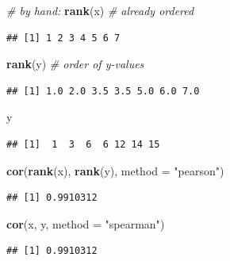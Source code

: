 \documentclass[
]{book}
\newenvironment{Shaded}{\begin{snugshade}}{\end{snugshade}}
\newcommand{\AttributeTok}[1]{\textcolor[rgb]{0.13,0.29,0.53}{#1}}
\newcommand{\CommentTok}[1]{\textcolor[rgb]{0.56,0.35,0.01}{\textit{#1}}}
\newcommand{\FunctionTok}[1]{\textcolor[rgb]{0.13,0.29,0.53}{\textbf{#1}}}
\newcommand{\NormalTok}[1]{#1}
\newcommand{\StringTok}[1]{\textcolor[rgb]{0.31,0.60,0.02}{#1}}
\begin{document}
\begin{Shaded}
\begin{Highlighting}[]
\CommentTok{\# by hand:}
\FunctionTok{rank}\NormalTok{(x) }\CommentTok{\# already ordered}
\end{Highlighting}
\end{Shaded}

\begin{verbatim}
## [1] 1 2 3 4 5 6 7
\end{verbatim}

\begin{Shaded}
\begin{Highlighting}[]
\FunctionTok{rank}\NormalTok{(y) }\CommentTok{\# order of y{-}values}
\end{Highlighting}
\end{Shaded}

\begin{verbatim}
## [1] 1.0 2.0 3.5 3.5 5.0 6.0 7.0
\end{verbatim}

\begin{Shaded}
\begin{Highlighting}[]
\NormalTok{y}
\end{Highlighting}
\end{Shaded}

\begin{verbatim}
## [1]  1  3  6  6 12 14 15
\end{verbatim}

\begin{Shaded}
\begin{Highlighting}[]
\FunctionTok{cor}\NormalTok{(}\FunctionTok{rank}\NormalTok{(x), }\FunctionTok{rank}\NormalTok{(y), }\AttributeTok{method =} \StringTok{"pearson"}\NormalTok{)}
\end{Highlighting}
\end{Shaded}

\begin{verbatim}
## [1] 0.9910312
\end{verbatim}

\begin{Shaded}
\begin{Highlighting}[]
\FunctionTok{cor}\NormalTok{(x, y, }\AttributeTok{method =} \StringTok{"spearman"}\NormalTok{)}
\end{Highlighting}
\end{Shaded}

\begin{verbatim}
## [1] 0.9910312
\end{verbatim}
\end{document}
